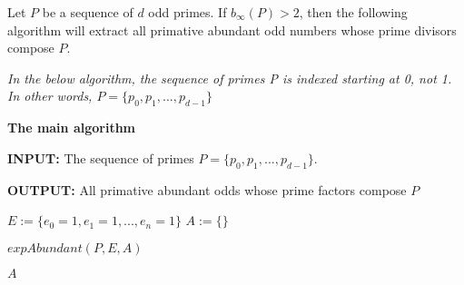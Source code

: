 \documentclass[../paper.tex]{subfiles}
\begin{document}
\begin{theorem} 
Let $P$ be a sequence of $d$ odd primes. If $b_{\infty}(P) > 2$, then the 
following algorithm will extract all primative
abundant odd numbers whose prime divisors compose $P$.
\end{theorem}
%
%
%
%
%


\textit{In the below algorithm, the sequence of primes P is indexed 
starting at 0, not 1. In other words, $P = \{p_0, p_1, ..., p_{d-1}\}$}



{\setlength{\parindent}{0cm}

\textbf{The main algorithm}

\textbf{INPUT:} The sequence of primes 
$P = \{p_0, p_1, ..., p_{d-1}\}$.

\textbf{OUTPUT:} All primative abundant odds whose prime factors
compose $P$

}


\begin{algorithmic}

\STATE $E := \{e_0 = 1,e_1 = 1,...,e_n = 1\}$
\STATE $A := \{ \}$ %

\STATE $expAbundant(P, E, A)$

\RETURN $A$

\end{algorithmic}
\end{document}
